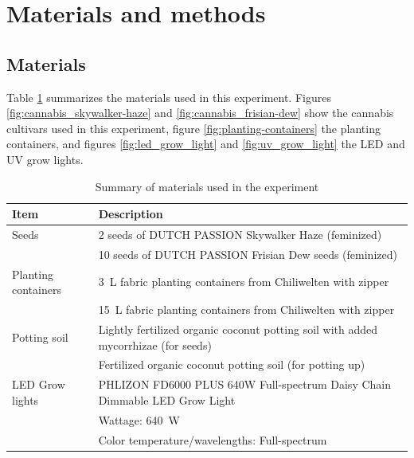 \section{Materials and methods}

\subsection{Materials}

Table \ref{tab:materials} summarizes the materials used in this experiment. Figures \ref{fig:cannabis_skywalker-haze} and \ref{fig:cannabis_frisian-dew} show the cannabis cultivars used in this experiment, figure \ref{fig:planting-containers} the planting containers, and figures \ref{fig:led_grow_light} and \ref{fig:uv_grow_light} the LED and UV grow lights.

\begin{table}[htbp]
    \caption{Summary of materials used in the experiment}
    \label{tab:materials}
    \begin{tabularx}{\linewidth}{l|X}
        \toprule
        \textbf{Item} & \textbf{Description} \\
        \midrule
        Seeds\index{seeds!cannabis} & 2 seeds of DUTCH PASSION Skywalker Haze\index{seeds!cannabis!Skywalker Haze} (feminized) \\
        & 10 seeds of DUTCH PASSION Frisian Dew seeds\index{seeds!cannabis!Frisian Dew} (feminized) \\
        \bigstrut
        Planting containers\index{planting container} & \qty[mode=text]{3}{\L} fabric planting containers from Chiliwelten with zipper \\
        & \qty[mode=text]{15}{\L} fabric planting containers from Chiliwelten with zipper \\
        \bigstrut
        Potting soil\index{potting soil} & Lightly fertilized organic coconut potting soil with added mycorrhizae\index{mycorrhizae} (for seeds) \\
        & Fertilized organic coconut potting soil (for potting up) \\
        \bigstrut
        LED Grow lights\index{grow light!LED} & PHLIZON FD6000 PLUS 640W Full-spectrum Daisy Chain Dimmable LED Grow Light\index{grow light!LED!PHLIZON FD6000 PLUS 640W Full-spectrum} \\
        & \quad Wattage: \qty[mode=text]{640}{\W} \\
        & \quad Color temperature/wavelengths: Full-spectrum \\

\end{tabularx}
\end{table}
